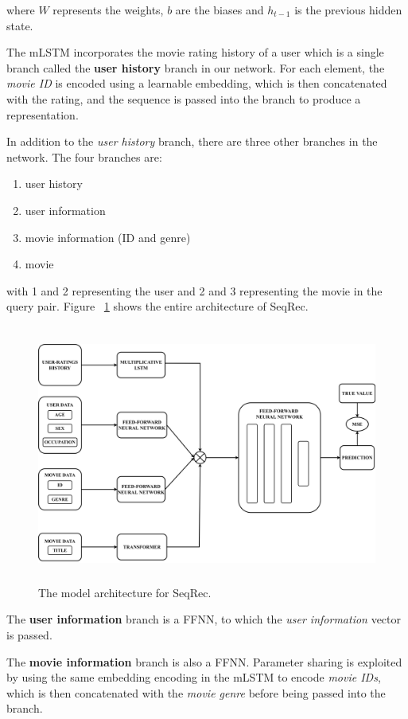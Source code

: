 \documentclass{bioinfo}
\begin{document}
\begin{methods}

where {${W}$} represents the weights, {${b}$} are the biases and {${h_{t-1}}$} is the previous hidden state.  

The mLSTM incorporates the movie rating history of a user which is a single branch called the \textbf{user history} branch in our network. For each element, the \textit{movie ID} is encoded using a learnable embedding, which is then concatenated with the rating, and the sequence is passed into the branch to produce a representation.

In addition to the \textit{user history} branch, there are three other branches in the network. The four branches are:
\begin{enumerate}
    \item user history
    \item user information
    \item movie information (ID and genre)
    \item movie
\end{enumerate}
with 1 and 2 representing the user and 2 and 3 representing the movie in the query pair. Figure ~\ref{fig:model} shows the entire architecture of SeqRec.

\begin{figure}[h]
    \centering
    \includegraphics[width=\textwidth,height=85mm]{figures/model2.png}
    \caption{The model architecture for SeqRec.}
    \label{fig:model}
\end{figure}

The \textbf{user information} branch is a FFNN, to which the \textit{user information} vector is passed.

The \textbf{movie information} branch is also a FFNN. Parameter sharing is exploited by using the same embedding encoding in the mLSTM to encode \textit{movie IDs}, which is then concatenated with the \textit{movie genre} before being passed into the branch.


\end{methods}
\end{document}
